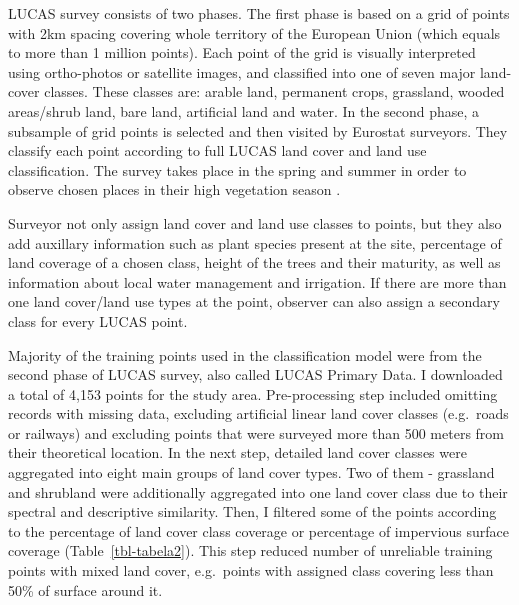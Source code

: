 \documentclass{amuthesis}
\begin{document}
LUCAS survey consists of two phases. The first phase is based on a grid
of points with 2km spacing covering whole territory of the European
Union (which equals to more than 1 million points). Each point of the
grid is visually interpreted using ortho-photos or satellite images, and
classified into one of seven major land-cover classes. These classes
are: arable land, permanent crops, grassland, wooded areas/shrub land,
bare land, artificial land and water. In the second phase, a subsample
of grid points is selected and then visited by Eurostat surveyors. They
classify each point according to full LUCAS land cover and land use
classification. The survey takes place in the spring and summer in order
to observe chosen places in their high vegetation season
\autocite{dandrimont_harmonised_2020}.

Surveyor not only assign land cover and land use classes to points, but
they also add auxillary information such as plant species present at the
site, percentage of land coverage of a chosen class, height of the trees
and their maturity, as well as information about local water management
and irrigation. If there are more than one land cover/land use types at
the point, observer can also assign a secondary class for every LUCAS
point.

Majority of the training points used in the classification model were
from the second phase of LUCAS survey, also called LUCAS Primary Data. I
downloaded a total of 4,153 points for the study area. Pre-processing
step included omitting records with missing data, excluding artificial
linear land cover classes (e.g.~roads or railways) and excluding points
that were surveyed more than 500 meters from their theoretical location.
In the next step, detailed land cover classes were aggregated into eight
main groups of land cover types. Two of them - grassland and shrubland
were additionally aggregated into one land cover class due to their
spectral and descriptive similarity. Then, I filtered some of the points
according to the percentage of land cover class coverage or percentage
of impervious surface coverage (Table~\ref{tbl-tabela2}). This step
reduced number of unreliable training points with mixed land cover,
e.g.~points with assigned class covering less than 50\% of surface
around it.
\end{document}
